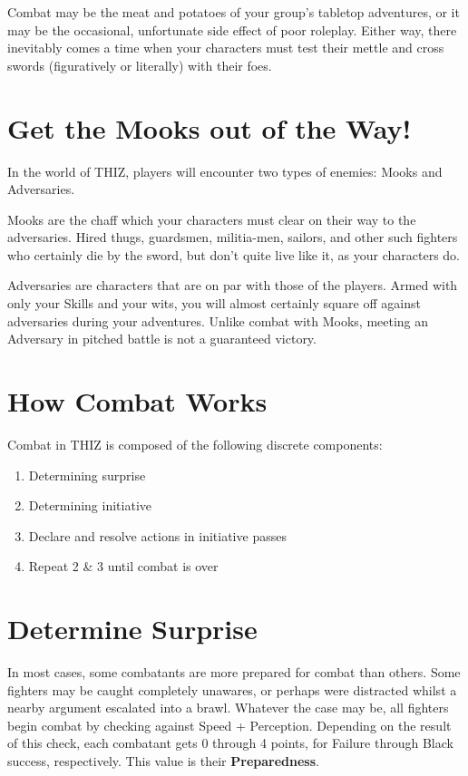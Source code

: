 \documentclass[oneside]{book}
\begin{document}
\begin{multicols}{2}
Combat may be the meat and potatoes of your group's tabletop adventures, or it may be the occasional, unfortunate side effect of poor roleplay. Either way, there inevitably comes a time when your characters must test their mettle and cross swords (figuratively or literally) with their foes. 

\section{Get the Mooks out of the Way!}
In the world of THIZ, players will encounter two types of enemies: Mooks and Adversaries. 

Mooks are the chaff which your characters must clear on their way to the adversaries. Hired thugs, guardsmen, militia-men, sailors, and other such fighters who certainly die by the sword, but don't quite live like it, as your characters do. 

Adversaries are characters that are on par with those of the players. Armed with only your Skills and your wits, you will almost certainly square off against adversaries during your adventures. Unlike combat with Mooks, meeting an Adversary in pitched battle is not a guaranteed victory. 

\section{How Combat Works}
Combat in THIZ is composed of the following discrete components:
\begin{enumerate}
  \setlength{\itemsep}{0cm}%
  \setlength{\parskip}{0cm}%
  \item Determining surprise
  \item Determining initiative
  \item Declare and resolve actions in initiative passes
  \item Repeat 2 \& 3 until combat is over
\end{enumerate}

\section{Determine Surprise}
In most cases, some combatants are more prepared for combat than others. Some fighters may be caught completely unawares, or perhaps were distracted whilst a nearby argument escalated into a brawl. Whatever the case may be, all fighters begin combat by checking against Speed + Perception. Depending on the result of this check, each combatant gets 0 through 4 points, for Failure through Black success, respectively. This value is their \textbf{Preparedness}.  


\end{multicols}
\end{document}
